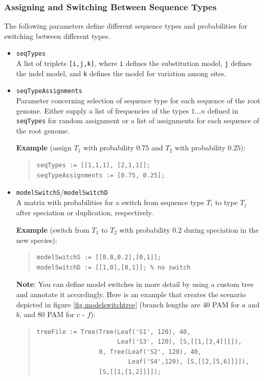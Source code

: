 \documentclass[11pt]{article}
\begin{document}
\subsubsection{Assigning and Switching Between Sequence Types}
\label{sec.seqtypes}
The following parameters define different sequence types and probabilities for switching between different types.
\begin{itemize}
\item{\texttt{seqTypes}} \hfill \\
A list of triplets \texttt{[i,j,k]}, where \texttt{i} defines the substitution model, \texttt{j} defines the indel model, and \texttt{k} defines the model for variation among sites.
\item{\texttt{seqTypeAssignments}} \hfill \\
Parameter concerning selection of sequence type for each sequence of the root genome. Either supply a list of frequencies of the types $1\ldots n$ defined in \texttt{seqTypes} for random assignment or a list of assignments for each sequence of the root genome.

\noindent \textbf{Example} (assign $T_{1}$ with probability $0.75$ and $T_{2}$ with probability $0.25$):
\begin{quote}
\begin{verbatim}
seqTypes := [[1,1,1], [2,1,1]];
seqTypeAssignments := [0.75, 0.25];
\end{verbatim}
\end{quote}
\item{\texttt{modelSwitchS}/\texttt{modelSwitchD}} \hfill \\
A matrix with probabilities for a switch from sequence type $T_{i}$ to type $T_{j}$ after speciation or duplication, respectively.

\noindent \textbf{Example} (switch from $T_{1}$ to $T_{2}$ with probability $0.2$ during speciation in the new species):
\begin{quote}
\begin{verbatim}
modelSwitchS := [[0.8,0.2],[0,1]];
modelSwitchD := [[1,0],[0,1]]; % no switch
\end{verbatim}
\end{quote}

\noindent \textbf{Note}: You can define model switches in more detail by using a custom tree and annotate it accordingly. Here is an example that creates the scenario depicted in figure \ref{fig.modelswitchtree} (branch lengths are 40 PAM for $a$ and $b$, and 80 PAM for $c$ - $f$):
\begin{quote}
\begin{verbatim}
treeFile := Tree(Tree(Leaf('S1', 120), 40, 
                      Leaf('S3', 120), [S,[[1,[3,4]]]]), 
                 0, Tree(Leaf('S2', 120), 40, 
                         Leaf('S4',120), [S,[[2,[5,6]]]]), 
                 [S,[[1,[1,2]]]]);
\end{verbatim}
\end{quote}


\end{itemize}
\end{document}
